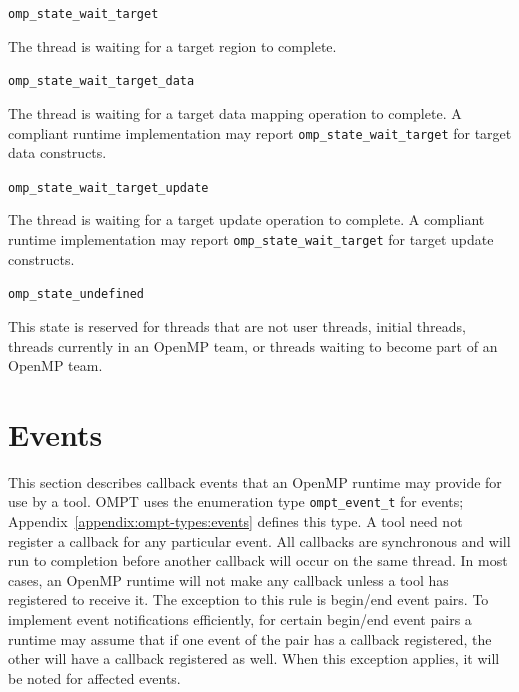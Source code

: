 \documentclass{article}
\newcommand{\descheader}[1]{{\needspace{3\baselineskip}\vspace{1em}\noindent \fbox{#1}}}
\begin{document}
\begin{description}

\item \verb|omp_state_wait_target| 

  The thread is waiting for a target region to complete.
  
\item \verb|omp_state_wait_target_data| 

  The thread is waiting for a target data mapping operation to complete. 
  A  compliant runtime implementation may report \verb|omp_state_wait_target| for target data constructs.

\item \verb|omp_state_wait_target_update| 

  The thread is waiting for a target  update operation to complete. 
  A  compliant runtime implementation may report \verb|omp_state_wait_target| for target update constructs.

\end{description}

\descheader{Undefined}

\begin{description}

\item \verb|omp_state_undefined| 

  This state is reserved for threads that are not user threads,
  initial threads, threads currently in an OpenMP team, or threads
  waiting to become part of an OpenMP team.

\end{description}

\section{Events}
\label{sec:events} 

This section describes callback events that an OpenMP runtime 
may provide for use by a tool. OMPT uses the enumeration type \verb|ompt_event_t| for events; 
Appendix~\ref{appendix:ompt-types:events} defines this type. 
A tool need not register a callback for any particular event.
All callbacks are synchronous and will run to completion before another callback will occur on the same thread.
In most cases, an OpenMP runtime will not make any callback unless a  tool has registered to receive it. The exception to this rule is begin/end event pairs. 
To implement event notifications efficiently, for certain begin/end event pairs a runtime may assume that if one event of the pair has a callback registered, the other will have a callback registered as well. When this exception applies, it will be noted for affected events.
\end{document}
